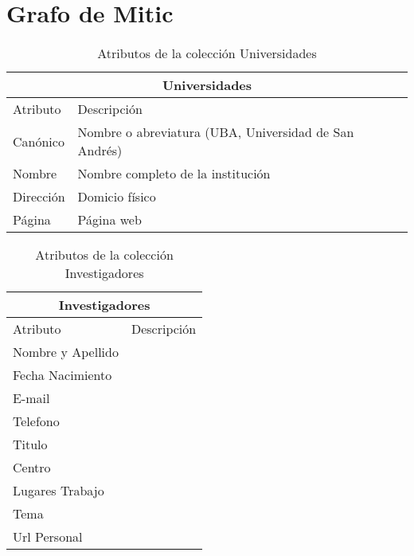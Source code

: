 \chapter{Grafo de Mitic}
\label{chap:db}

\begin{center}
\begin{table}
\centering
\begin{tabular}{| l | l |}
\hline
\multicolumn{2}{|c|}{Universidades} \\ \hline
Atributo & Descripción \\ \hline
Canónico & Nombre o abreviatura (UBA, Universidad de San Andrés)\\ \hline
Nombre& Nombre completo de la institución\\ \hline
Dirección & Domicio físico\\ \hline
Página & Página web\\ \hline
\end{tabular}
\caption{Atributos de la colección Universidades}
\label{table:universidades}
\end{table}
\end{center}

\begin{center}
\begin{table}
\begin{tabular}{| l | l |}
\hline
\multicolumn{2}{|c|}{Investigadores} \\ \hline
Atributo & Descripción \\ \hline
	Nombre y Apellido & \\ \hline
	Fecha Nacimiento & \\ \hline
	E-mail & \\ \hline
  Telefono & \\ \hline
  Titulo & \\ \hline
  Centro & \\ \hline
	Lugares Trabajo & \\ \hline
	Tema & \\ \hline
	Url Personal & \\ \hline
\end{tabular}
\caption{Atributos de la colección Investigadores}
\label{table:investigadores}
\end{table}
\end{center}


